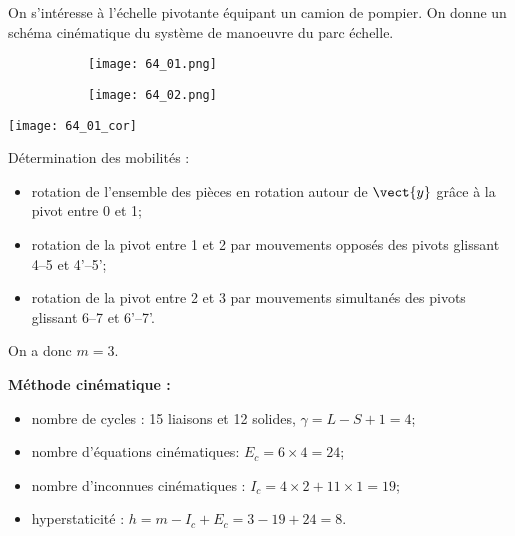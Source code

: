 \normaltrue \difficilefalse \tdifficilefalse
\correctiontrue

\setcounter{question}{0}%


\ifcorrection
\else
{}
\fi

\ifprof
\else
On s'intéresse à l'échelle pivotante équipant un camion de pompier. On donne un schéma cinématique du système de manoeuvre du parc échelle.
 
\begin{figure}[h!]
\centering
    \begin{subfigure}[c]{0.45\textwidth}
        \centering
        \texttt{[image: 64\_01.png]}
    \end{subfigure}%
    \hfill
    \begin{subfigure}[c]{0.45\textwidth}
        \centering
        \texttt{[image: 64\_02.png]}
    \end{subfigure}
\end{figure}
\fi

\ifprof

\begin{center}
\texttt{[image: 64\_01\_cor]}
\end{center}

\else 
\fi

\ifprof
Détermination des mobilités : 
\begin{itemize}
\item rotation de l'ensemble des pièces en rotation autour de $\vect{y}$ grâce à la pivot entre 0 et 1;
\item rotation de la pivot entre 1 et 2 par mouvements opposés des pivots glissant 4--5 et 4'--5';
\item rotation de la pivot entre 2 et 3 par mouvements simultanés des pivots glissant 6--7 et 6'--7'.
\end{itemize}
On a donc $m=3$. 

\textbf{Méthode cinématique : }
\begin{itemize}
\item nombre de cycles : 15 liaisons et 12 solides, $\gamma = L- S + 1 =4$;
\item nombre d'équations cinématiques: $E_c = 6\times 4 = 24$;
\item nombre d'inconnues cinématiques : $I_c = 4 \times 2+ 11 \times 1 = 19$;
\item hyperstaticité : $h=m-I_c + E_c = 3 -19 + 24 = 8$.
\end{itemize}


